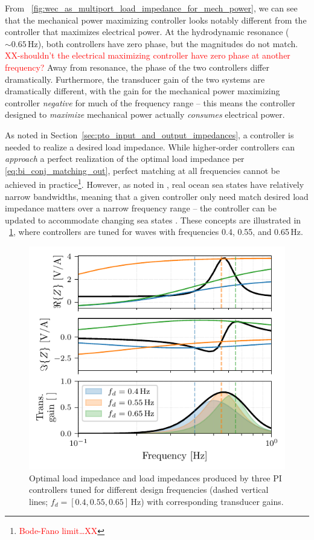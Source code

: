\documentclass[lettersize,journal]{IEEEtran}
\newcommand{\rc}[1]{\textcolor{red}{#1}}
\begin{document}
\noindent{}From \figurename~\ref{fig:wec_as_multiport_load_impedance_for_mech_power}, we can see that the mechanical power maximizing controller looks notably different from the controller that maximizes electrical power.
At the hydrodynamic resonance ($\sim 0.65$\,Hz), both controllers have zero phase, but the magnitudes do not match.
\rc{XX-shouldn't the electrical maximizing controller have zero phase at another frequency?}
Away from resonance, the phase of the two controllers differ dramatically.
Furthermore, the transducer gain of the two systems are dramatically different, with the gain for the mechanical power maximizing controller \emph{negative} for much of the frequency range -- this means the controller designed to \emph{maximize} mechanical power actually \emph{consumes} electrical power.

As noted in Section~\ref{sec:pto_input_and_output_impedances}, a controller is needed to realize a desired load impedance.
While higher-order controllers can \emph{approach} a perfect realization of the optimal load impedance per \eqref{eq:bi_conj_matching_out}, perfect matching at all frequencies cannot be achieved in practice\footnote{\rc{Bode-Fano limit\dots{}XX}}.
However, as noted in \cite{Coe2020a}, real ocean sea states have relatively narrow bandwidths, meaning that a given controller only need match desired load impedance matters over a narrow frequency range -- the controller can be updated to accommodate changing sea states \cite{Forbush:2022aa}.
These concepts are illustrated in \figurename~\ref{fig:gfx/wec_as_multiport_pi_controllers_real_imag}, where controllers are tuned for waves with frequencies 0.4, 0.55, and 0.65\,Hz.

\begin{figure}[tb]
        \centering
        \includegraphics[width=1\columnwidth]{wec_as_multiport_pi_controllers_real_imag.pdf}
        \caption{Optimal load impedance and load impedances produced by three PI controllers tuned for different design frequencies (dashed vertical lines; $f_d = [0.4, 0.55, 0.65]$\,Hz) with corresponding transducer gains.}
        \label{fig:gfx/wec_as_multiport_pi_controllers_real_imag}
\end{figure}
\end{document}
